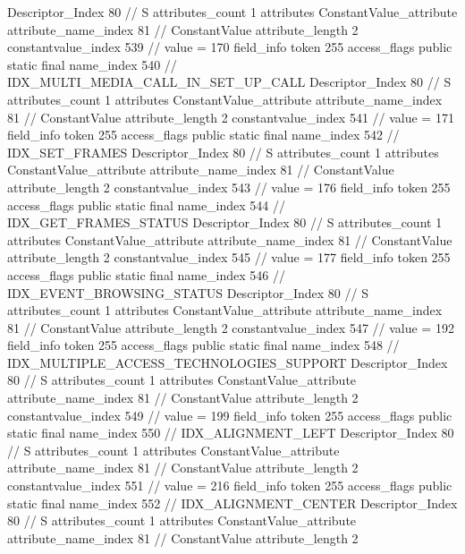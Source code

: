 {{{{{				Descriptor_Index	80		// S
				attributes_count	1
				attributes {
				ConstantValue_attribute {
					attribute_name_index	81		// ConstantValue
					attribute_length	2
					constantvalue_index	539		// value = 170
				}
				}
			}
			field_info {
				token	255
				access_flags	public static final
				name_index	540		// IDX_MULTI_MEDIA_CALL_IN_SET_UP_CALL
				Descriptor_Index	80		// S
				attributes_count	1
				attributes {
				ConstantValue_attribute {
					attribute_name_index	81		// ConstantValue
					attribute_length	2
					constantvalue_index	541		// value = 171
				}
				}
			}
			field_info {
				token	255
				access_flags	public static final
				name_index	542		// IDX_SET_FRAMES
				Descriptor_Index	80		// S
				attributes_count	1
				attributes {
				ConstantValue_attribute {
					attribute_name_index	81		// ConstantValue
					attribute_length	2
					constantvalue_index	543		// value = 176
				}
				}
			}
			field_info {
				token	255
				access_flags	public static final
				name_index	544		// IDX_GET_FRAMES_STATUS
				Descriptor_Index	80		// S
				attributes_count	1
				attributes {
				ConstantValue_attribute {
					attribute_name_index	81		// ConstantValue
					attribute_length	2
					constantvalue_index	545		// value = 177
				}
				}
			}
			field_info {
				token	255
				access_flags	public static final
				name_index	546		// IDX_EVENT_BROWSING_STATUS
				Descriptor_Index	80		// S
				attributes_count	1
				attributes {
				ConstantValue_attribute {
					attribute_name_index	81		// ConstantValue
					attribute_length	2
					constantvalue_index	547		// value = 192
				}
				}
			}
			field_info {
				token	255
				access_flags	public static final
				name_index	548		// IDX_MULTIPLE_ACCESS_TECHNOLOGIES_SUPPORT
				Descriptor_Index	80		// S
				attributes_count	1
				attributes {
				ConstantValue_attribute {
					attribute_name_index	81		// ConstantValue
					attribute_length	2
					constantvalue_index	549		// value = 199
				}
				}
			}
			field_info {
				token	255
				access_flags	public static final
				name_index	550		// IDX_ALIGNMENT_LEFT
				Descriptor_Index	80		// S
				attributes_count	1
				attributes {
				ConstantValue_attribute {
					attribute_name_index	81		// ConstantValue
					attribute_length	2
					constantvalue_index	551		// value = 216
				}
				}
			}
			field_info {
				token	255
				access_flags	public static final
				name_index	552		// IDX_ALIGNMENT_CENTER
				Descriptor_Index	80		// S
				attributes_count	1
				attributes {
				ConstantValue_attribute {
					attribute_name_index	81		// ConstantValue
					attribute_length	2
}}}}}}}
